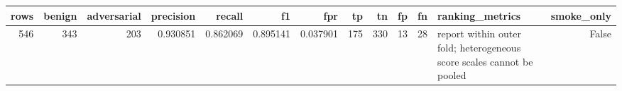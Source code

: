 \begin{tabular}{rrrrrrrrrrrlr}
\toprule
rows & benign & adversarial & precision & recall & f1 & fpr & tp & tn & fp & fn & ranking_metrics & smoke_only \\
\midrule
546 & 343 & 203 & 0.930851 & 0.862069 & 0.895141 & 0.037901 & 175 & 330 & 13 & 28 & report within outer fold; heterogeneous score scales cannot be pooled & False \\
\bottomrule
\end{tabular}
